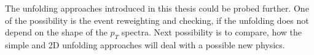 \documentclass[a4paper,11pt,twoside,openright]{book}
\newcommand{\MyQuote}[2]{
  \begin{flushleft}
    \textit{\quotation{#1}}
  \end{flushleft}
  \begin{flushright}
    #2
  \end{flushright}
  \vspace{10mm}
}
\newcommand{\pt}{p_{T}}
\begin{document}
The unfolding approaches introduced in this thesis could be probed further. One
of the possibility is the event reweighting and checking, if the unfolding does
not depend on the shape of the $\pt$ spectra. Next possibility is to compare,
how the simple and 2D unfolding approaches will deal with a possible new physics.






\clearpage
{}



\cleardoublepage

%
%
%
%
%
%
%
\end{document}
